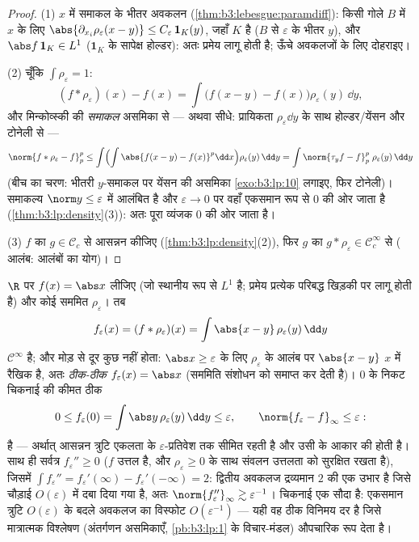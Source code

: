 \begin{proof}
(1) $x$ में समाकल के भीतर अवकलन (\cref{thm:b3:lebesgue:paramdiff}): किसी गोले $B$ में
$x$ के लिए $\abs{\partial_{x_i}\rho_\varepsilon(x - y)} \leq
C_\varepsilon\,\mathbf 1_{K}(y)$, जहाँ $K$  है ($B$ से $\varepsilon$ के भीतर
$y$), और $\abs f\,\mathbf 1_K \in L^1$ ($\mathbf 1_K$ के सापेक्ष होल्डर): अतः प्रमेय लागू होती
है; ऊँचे अवकलजों के लिए दोहराइए।

(2) चूँकि $\int\rho_\varepsilon = 1$:
\[
(f * \rho_\varepsilon)(x) - f(x)
= \int \bigl(f(x - y) - f(x)\bigr)\rho_\varepsilon(y)\,\dd y ,
\]
और मिन्कोव्स्की की \emph{समाकल} असमिका से --- अथवा सीधे: प्रायिकता
 $\rho_\varepsilon\dd y$ के साथ होल्डर/येंसन और टोनेली से ---
\[
\norm{f*\rho_\varepsilon - f}_p^p
\leq \int\Bigl(\int\abs{f(x-y) -
f(x)}^p\dd x\Bigr)\rho_\varepsilon(y)\,\dd y
= \int \norm{\tau_yf - f}_p^p\;\rho_\varepsilon(y)\,\dd y
\]
(बीच का चरण: भीतरी $y$-समाकल पर येंसन की असमिका \cref{exo:b3:lp:10} लगाइए,
फिर टोनेली)। समाकल्य $\norm y \leq \varepsilon$ में आलंबित है और $\varepsilon \to 0$ पर वहाँ एकसमान
रूप से $0$ की ओर जाता है (\cref{thm:b3:lp:density}(3)): अतः पूरा व्यंजक $0$ की ओर
जाता है।

(3) $f$ का $g \in \mathcal C_c$ से आसन्नन कीजिए (\cref{thm:b3:lp:density}(2)), फिर $g$ का $g *
\rho_\varepsilon \in \mathcal C_c^\infty$
से ( आलंब: आलंबों का योग)।
\end{proof}

\begin{example}
\label{ex:b3:lp:mollifyexample}
$\R$ पर $f(x) = \abs x$ लीजिए (जो स्थानीय रूप से $L^1$ है; प्रमेय प्रत्येक
परिबद्ध खिड़की पर लागू होती है) और कोई सममित  $\rho_\varepsilon$। तब
\[
f_\varepsilon(x) = (f * \rho_\varepsilon)(x)
= \int\abs{x - y}\,\rho_\varepsilon(y)\,\dd y
\]
$\mathcal C^\infty$ है; और मोड़ से दूर कुछ नहीं होता: $\abs x \geq \varepsilon$ के लिए $\rho_\varepsilon$ के आलंब
पर $\abs{x - y}$ $x$ में रैखिक है, अतः \emph{ठीक-ठीक} $f_\varepsilon(x) =
\abs x$ (सममिति
संशोधन को समाप्त कर देती है)। $0$ के निकट चिकनाई की कीमत ठीक
\[
0 \leq f_\varepsilon(0) = \int\abs
y\,\rho_\varepsilon(y)\,\dd y \leq \varepsilon,
\qquad
\norm{f_\varepsilon - f}_\infty \leq \varepsilon :
\]
है --- अर्थात् आसन्नन त्रुटि एकलता के $\varepsilon$-प्रतिवेश तक सीमित रहती
है और उसी के आकार की होती है। साथ ही सर्वत्र $f_\varepsilon'' \geq 0$ ($f$ उत्तल है,
और $\rho_\varepsilon
\geq 0$ के साथ संवलन उत्तलता को सुरक्षित रखता है), जिसमें $\int f_\varepsilon'' =
f_\varepsilon'(\infty) - f_\varepsilon'(-\infty) = 2$:
द्वितीय अवकलज द्रव्यमान $2$ की एक उभार है जिसे चौड़ाई $O(\varepsilon)$ में
दबा दिया गया है, अतः $\norm{f_\varepsilon''}_\infty \gtrsim
\varepsilon^{-1}$। चिकनाई एक सौदा है: एकसमान त्रुटि $O(\varepsilon)$
के बदले अवकलज का विस्फोट $O(\varepsilon^{-1})$ --- यही वह ठीक विनिमय दर है जिसे
मात्रात्मक विश्लेषण (अंतर्गणन असमिकाएँ, \cref{pb:b3:lp:1} के विचार-मंडल)
औपचारिक रूप देता है।
\end{example}

